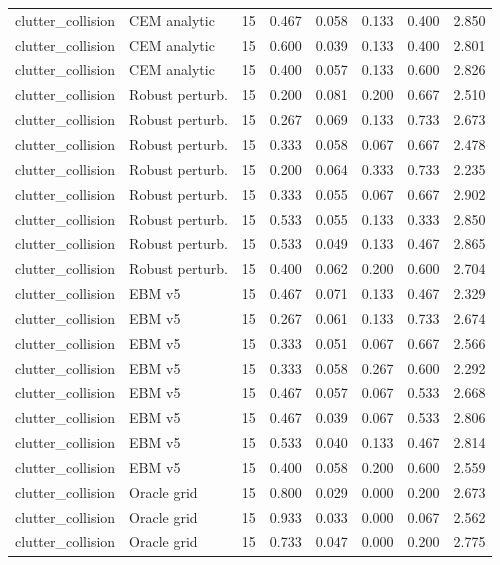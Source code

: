 {\begin{longtable}{llrrrrrr}
clutter\_collision & CEM analytic & 15 & 0.467 & 0.058 & 0.133 & 0.400 & 2.850 \\
clutter\_collision & CEM analytic & 15 & 0.600 & 0.039 & 0.133 & 0.400 & 2.801 \\
clutter\_collision & CEM analytic & 15 & 0.400 & 0.057 & 0.133 & 0.600 & 2.826 \\
clutter\_collision & Robust perturb. & 15 & 0.200 & 0.081 & 0.200 & 0.667 & 2.510 \\
clutter\_collision & Robust perturb. & 15 & 0.267 & 0.069 & 0.133 & 0.733 & 2.673 \\
clutter\_collision & Robust perturb. & 15 & 0.333 & 0.058 & 0.067 & 0.667 & 2.478 \\
clutter\_collision & Robust perturb. & 15 & 0.200 & 0.064 & 0.333 & 0.733 & 2.235 \\
clutter\_collision & Robust perturb. & 15 & 0.333 & 0.055 & 0.067 & 0.667 & 2.902 \\
clutter\_collision & Robust perturb. & 15 & 0.533 & 0.055 & 0.133 & 0.333 & 2.850 \\
clutter\_collision & Robust perturb. & 15 & 0.533 & 0.049 & 0.133 & 0.467 & 2.865 \\
clutter\_collision & Robust perturb. & 15 & 0.400 & 0.062 & 0.200 & 0.600 & 2.704 \\
clutter\_collision & EBM v5 & 15 & 0.467 & 0.071 & 0.133 & 0.467 & 2.329 \\
clutter\_collision & EBM v5 & 15 & 0.267 & 0.061 & 0.133 & 0.733 & 2.674 \\
clutter\_collision & EBM v5 & 15 & 0.333 & 0.051 & 0.067 & 0.667 & 2.566 \\
clutter\_collision & EBM v5 & 15 & 0.333 & 0.058 & 0.267 & 0.600 & 2.292 \\
clutter\_collision & EBM v5 & 15 & 0.467 & 0.057 & 0.067 & 0.533 & 2.668 \\
clutter\_collision & EBM v5 & 15 & 0.467 & 0.039 & 0.067 & 0.533 & 2.806 \\
clutter\_collision & EBM v5 & 15 & 0.533 & 0.040 & 0.133 & 0.467 & 2.814 \\
clutter\_collision & EBM v5 & 15 & 0.400 & 0.058 & 0.200 & 0.600 & 2.559 \\
clutter\_collision & Oracle grid & 15 & 0.800 & 0.029 & 0.000 & 0.200 & 2.673 \\
clutter\_collision & Oracle grid & 15 & 0.933 & 0.033 & 0.000 & 0.067 & 2.562 \\
clutter\_collision & Oracle grid & 15 & 0.733 & 0.047 & 0.000 & 0.200 & 2.775 \\

\end{longtable}}
